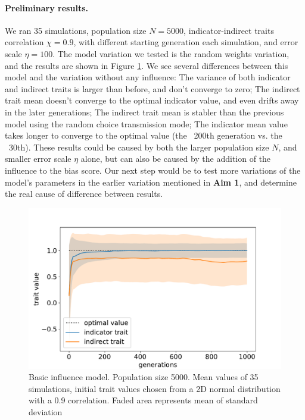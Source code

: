 \documentclass[11pt]{article}
\begin{document}
  \paragraph*{Preliminary results.}
  We ran 35 simulations, population size $N=5000$, indicator-indirect traits correlation $\chi=0.9$, with different starting generation each simulation, and error scale $\eta=100$.
  The model variation we tested is the random weights variation, and the results are shown in Figure \ref{basic influence fig}.
  We see several differences between this model and the variation without any influence: 
  The variance of both indicator and indirect traits is larger than before, and don't converge to zero;
  The indirect trait mean doesn't converge to the optimal indicator value, and even drifts away in the later generations;
  The indirect trait mean is stabler than the previous model using the random choice transmission mode; 
  The indicator mean value takes longer to converge to the optimal value (the ~200th generation vs. the ~30th).
  These results could be caused by both the larger population size $N$, and smaller error scale $\eta$ alone, but can also be caused by the addition of the influence to the bias score.
  Our next step would be to test more variations of the model's parameters in the earlier variation mentioned in \textbf{Aim 1}, and determine the real cause of difference between results. 
  
  \begin{figure}
    \includegraphics[width=\linewidth]{../../graphs/basic_influence/5000_1000_33_100es_09tc.pdf}
  \caption{Basic influence model. Population size 5000. Mean values of 35 simulations, initial trait values chosen from a 2D normal distribution with a 0.9 correlation. Faded area represents mean of standard deviation}
  \label{basic influence fig}
\end{figure}
  
\end{document}
